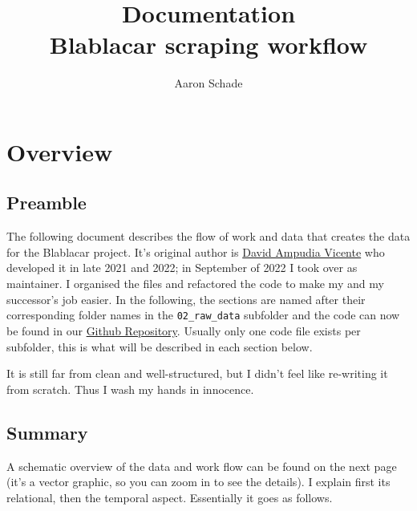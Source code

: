 \documentclass[11pt,a4paper]{article}
\author{Aaron Schade}
\title{Documentation \\Blablacar scraping workflow}
\begin{document}


\maketitle
\tableofcontents







\clearpage %
\section{Overview}



\subsection{Preamble}
The following document describes the flow of work and data that creates the data for the Blablacar project. 
It's original author is \href{mailto:dampudiavicente@gmail.com}{David Ampudia Vicente} who developed it in late 2021 and 2022; in September of 2022 I took over as maintainer. 
I organised the files and refactored the code to make my and my successor's job easier. 
In the following, the sections are named after their corresponding folder names in the \verb|02_raw_data| subfolder and the code can now be found in our \href{https://github.com/linkcharger/blablacar}{Github Repository}.
Usually only one code file exists per subfolder, this is what will be described in each section below.

It is still far from clean and well-structured, but I didn't feel like re-writing it from scratch. 
Thus I wash my hands in innocence.\footnotemark



\subsection{Summary}
A schematic overview of the data and work flow can be found on the next page (it's a vector graphic, so you can zoom in to see the details). 
I explain first its relational, then the temporal aspect.
Essentially it goes as follows.
\end{document}
